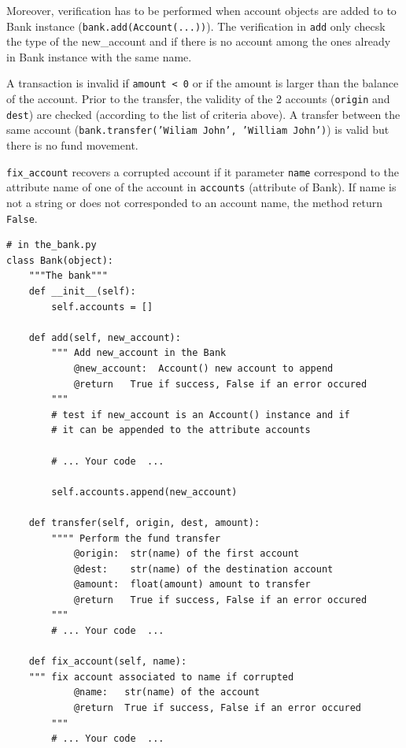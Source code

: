 \documentclass{42-en}
\begin{document}
Moreover, verification has to be performed when account objects are added to to Bank instance 
(\texttt{bank.add(Account(...))}).
The verification in \texttt{add} only checsk the type of the new\_account and if there 
is no account among the ones already in Bank instance with the same name.

A transaction is invalid if \texttt{amount < 0} or if the amount is larger than
the balance of the account.
Prior to the transfer, the validity of the 2 accounts (\texttt{origin} and \texttt{dest}) are checked
(according to the list of criteria above).
A transfer between the same account (\texttt{bank.transfer('Wiliam John', 'William John')})
is valid but there is no fund movement.

\texttt{fix\_account} recovers a corrupted account if it parameter \texttt{name} correspond to the attribute
name of one of the account in \texttt{accounts} (attribute of Bank). If name is not a string or does not corresponded
to an account name, the method return \texttt{False}.

\begin{verbatim}
# in the_bank.py
class Bank(object):
    """The bank"""
    def __init__(self):
        self.accounts = []

    def add(self, new_account):
        """ Add new_account in the Bank
            @new_account:  Account() new account to append
            @return   True if success, False if an error occured
        """
        # test if new_account is an Account() instance and if 
        # it can be appended to the attribute accounts
        
        # ... Your code  ...

        self.accounts.append(new_account)

    def transfer(self, origin, dest, amount):
        """" Perform the fund transfer
            @origin:  str(name) of the first account
            @dest:    str(name) of the destination account
            @amount:  float(amount) amount to transfer
            @return   True if success, False if an error occured
        """
        # ... Your code  ...

    def fix_account(self, name):
    """ fix account associated to name if corrupted
            @name:   str(name) of the account
            @return  True if success, False if an error occured
        """
        # ... Your code  ...
\end{verbatim}
\end{document}
